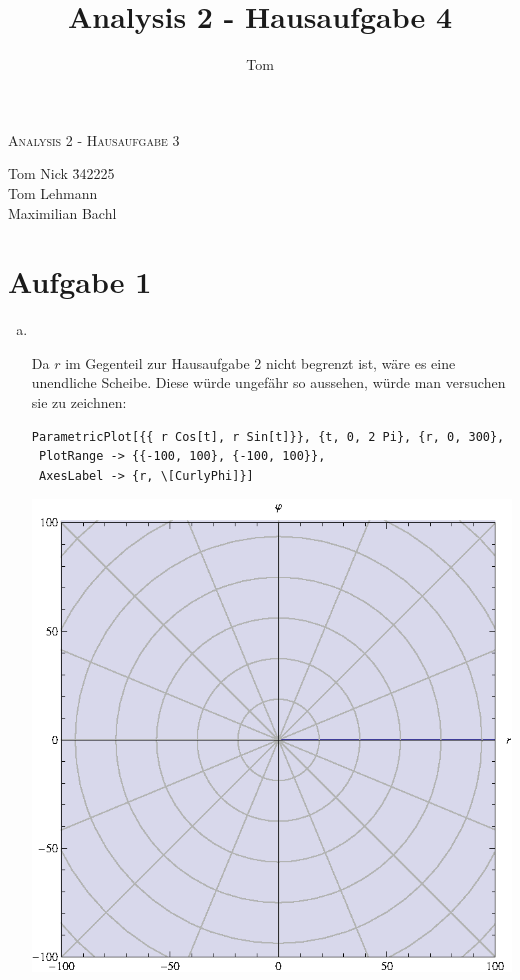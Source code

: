 \documentclass[10pt,a4paper,parskip=half]{scrartcl}
\author{Tom}
\title{Analysis 2 - Hausaufgabe 4}
\begin{document}
\begin{center}
\textsc{\Large{Analysis 2 - Hausaufgabe 3}} \\
\end{center}
\begin{tabbing}
Tom Nick \hspace{1.4cm}\= 342225\\
Tom Lehmann\\
Maximilian Bachl
\end{tabbing}
\section*{Aufgabe 1}
\begin{enumerate}[(a)]
\item \ \\
\begin{minipage}{0.50\columnwidth}
Da $r$ im Gegenteil zur Hausaufgabe 2 nicht begrenzt ist, wäre es eine unendliche Scheibe. Diese würde ungefähr so aussehen, würde man versuchen sie zu zeichnen:
\begin{lstlisting}[caption= Mathematica Code für den Graph von h]
ParametricPlot[{{ r Cos[t], r Sin[t]}}, {t, 0, 2 Pi}, {r, 0, 300},
 PlotRange -> {{-100, 100}, {-100, 100}},
 AxesLabel -> {r, \[CurlyPhi]}]
\end{lstlisting}
\end{minipage}
\begin{minipage}{0.49\columnwidth}
\begin{center}
\includegraphics[scale=0.7]{1i.eps}

\end{center}
\end{minipage}
\end{enumerate}
\end{document}
